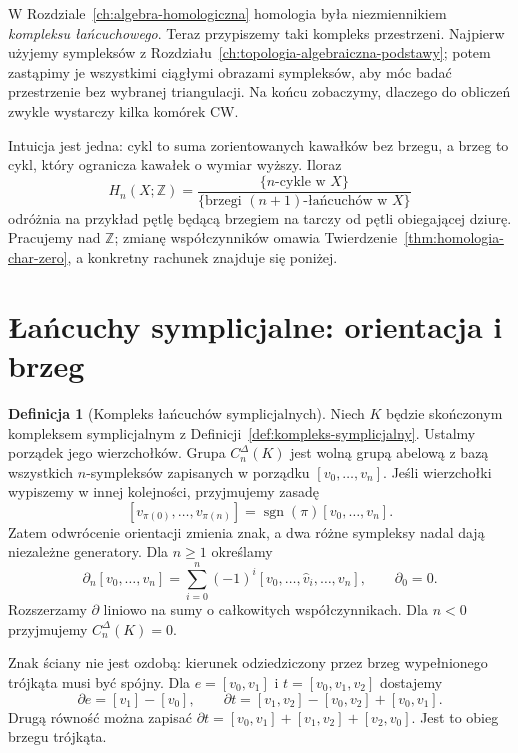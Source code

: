 \documentclass[11pt,a4paper,oneside]{report}
\newcommand{\Z}{\mathbb{Z}}
\theoremstyle{plain}
\theoremstyle{definition}
\newtheorem{definicja}[twierdzenie]{Definicja}
\theoremstyle{remark}
\begin{document}
W Rozdziale~\ref{ch:algebra-homologiczna} homologia była
niezmiennikiem \emph{kompleksu łańcuchowego}.
Teraz przypiszemy taki kompleks przestrzeni. Najpierw
użyjemy sympleksów z Rozdziału~\ref{ch:topologia-algebraiczna-podstawy};
potem zastąpimy je wszystkimi ciągłymi obrazami sympleksów,
aby móc badać przestrzenie bez wybranej triangulacji. Na końcu
zobaczymy, dlaczego do obliczeń zwykle wystarczy
kilka komórek CW.

Intuicja jest jedna: cykl to suma zorientowanych kawałków
bez brzegu, a brzeg to cykl, który ogranicza kawałek
o wymiar wyższy. Iloraz
\[
 H_n(X;\Z)=
 \frac{\{\text{$n$-cykle w $X$}\}}
 {\{\text{brzegi $(n+1)$-łańcuchów w $X$}\}}
\]
odróżnia na przykład pętlę będącą brzegiem na tarczy od pętli
obiegającej dziurę. Pracujemy nad $\Z$; zmianę
współczynników omawia
Twierdzenie~\ref{thm:homologia-char-zero},
a konkretny rachunek znajduje się poniżej.

\section{Łańcuchy symplicjalne: orientacja i brzeg}
\label{sec:homologia-symplicjalna}

\begin{definicja}[Kompleks łańcuchów symplicjalnych]
\label{def:homologia-symplicjalna}
Niech $K$ będzie skończonym kompleksem symplicjalnym
z Definicji~\ref{def:kompleks-symplicjalny}.
Ustalmy porządek jego wierzchołków. Grupa
$C_n^\Delta(K)$ jest wolną grupą abelową z bazą
wszystkich $n$-sympleksów zapisanych w porządku
$[v_0,\ldots,v_n]$. Jeśli wierzchołki wypiszemy
w innej kolejności, przyjmujemy zasadę
\[
 [v_{\pi(0)},\ldots,v_{\pi(n)}]
 =\operatorname{sgn}(\pi)[v_0,\ldots,v_n].
\]
Zatem odwrócenie orientacji zmienia znak, a dwa
różne sympleksy nadal dają niezależne generatory.
Dla $n\geq1$ określamy
\begin{equation}\label{eq:brzeg-symplicjalny}
 \partial_n[v_0,\ldots,v_n]
 =\sum_{i=0}^n(-1)^i
 [v_0,\ldots,\widehat v_i,\ldots,v_n],
 \qquad \partial_0=0.
\end{equation}
Rozszerzamy $\partial$ liniowo na sumy
o całkowitych współczynnikach. Dla $n<0$ przyjmujemy $C_n^\Delta(K)=0$.
\end{definicja}

Znak ściany nie jest ozdobą: kierunek odziedziczony
przez brzeg wypełnionego trójkąta musi być spójny.
Dla $e=[v_0,v_1]$ i $t=[v_0,v_1,v_2]$ dostajemy
\[
 \partial e=[v_1]-[v_0],\qquad
 \partial t=[v_1,v_2]-[v_0,v_2]+[v_0,v_1].
\]
Drugą równość można zapisać
$\partial t=[v_0,v_1]+[v_1,v_2]+[v_2,v_0]$.
Jest to obieg brzegu trójkąta.
\end{document}
